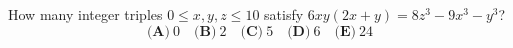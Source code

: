 How many integer triples $0\le x,y,z\le10$ satisfy $6xy(2x+y)=8z^3-9x^3-y^3$?
\[\textbf{(A)}~0\quad\textbf{(B)}~2\quad\textbf{(C)}~5\quad\textbf{(D)}~6\quad\textbf{(E)}~24\]
